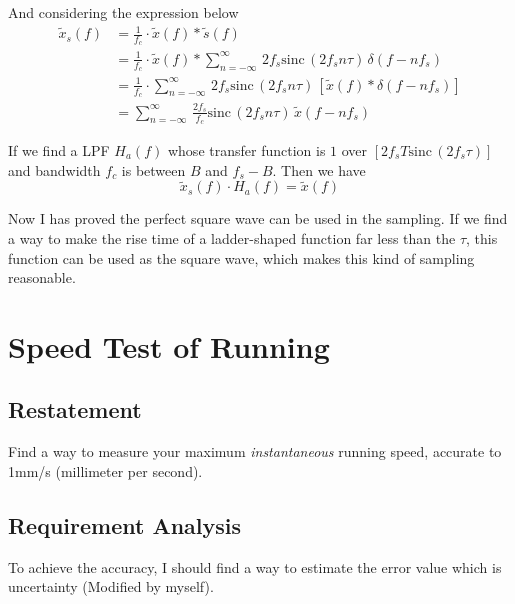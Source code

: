 \documentclass{article}
\begin{document}
And considering the expression below
\begin{equation}
    \begin{aligned}
        \widetilde{x}_s(f) & = \frac{1}{f_c} \cdot \widetilde{x}(f) * \widetilde{s}(f)                                                                                  \\
                           & = \frac{1}{f_c} \cdot \widetilde{x}(f) * \sum_{n = -\infty}^{\infty}\, 2f_s \mathrm{sinc}\, ( 2f_s n\tau)\, \delta(f - nf_s)               \\
                           & = \frac{1}{f_c} \cdot \sum_{n = -\infty}^{\infty}\, 2f_s \mathrm{sinc}\, ( 2f_s n\tau)\, \left[ \widetilde{x}(f) *\delta(f - nf_s) \right] \\
                           & = \sum_{n = -\infty}^{\infty}\,\frac{2f_s}{f_c} \mathrm{sinc}\, ( 2f_s n\tau)\, \widetilde{x}(f - nf_s)
    \end{aligned}
\end{equation}

If we find a LPF $H_a(f)$ whose transfer function is $1$ over $[2f_s T \mathrm{sinc}\, ( 2f_s\tau)]$ and bandwidth $f_c$ is between $B$ and $f_s - B$. Then we have
\begin{equation}
    \widetilde{x}_s(f) \cdot H_a(f) = \widetilde{x}(f)
\end{equation}

Now I has proved the perfect square wave can be used in the sampling. If we find a way to make the rise time of a ladder-shaped function far less than the $\tau$, this function can be used as the square wave, which makes this kind of sampling reasonable.


\section{Speed Test of Running}

\subsection{Restatement}
Find a way to measure your maximum \emph{instantaneous} running speed, accurate to 1mm/s (millimeter per second).

\subsection{Requirement Analysis}
\label{prepare}
To achieve the accuracy, I should find a way to estimate the error value which is uncertainty (Modified by myself).
\end{document}
